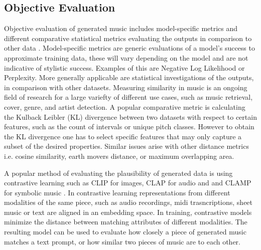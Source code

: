 \subsection{Objective Evaluation}

Objective evaluation of generated music includes model-specific metrics and different comparative statistical metrics evaluating the outputs in comparison to other data \cite{Xiong_Wang_ai_eval_methods_2023}. Model-specific metrics are generic evaluations of a model's success to approximate training data, these will vary depending on the model and are not indicative of stylistic success. Examples of this are Negative Log Likelihood \cite{Huang_Vaswani_Uszkoreit_Shazeer_Simon_Hawthorne_Dai_Hoffman_Dinculescu_Eck_2018} or Perplexity\cite{Rütte_figaro_2023}. 
More generally applicable are statistical investigations of the outputs, in comparison with other datasets. Measuring similarity in music is an ongoing field of research \cite{Gurjar_Moon_similarity_2018} for a large variefty of different use cases, such as music retrieval, cover, genre, and artist detection. A popular comparative metric is calculating the Kulback Leibler (KL) divergence between two datasets with respect to certain features, such as the count of intervals or unique pitch classes. However to obtain the KL divergence one has to select specific features that may only capture a subset of the desired properties. Similar issues arise with other distance metrics i.e. cosine similarity, earth movers distance, or maximum overlapping area. 

A popular method of evaluating the plausibility of generated data is using contrastive learning such as CLIP for images, CLAP for audio and \cite{Elizalde_Deshmukh_Ismail_Wang_2023} and CLAMP for symbolic music \cite{wu2024clamp2multimodalmusic}.  In contrastive learning representations from different modalities of the same piece, such as audio recordings, midi trasncriptions, sheet music or text are aligned in an embedding space. In training, contrastive models minimize the distance between matching attributes of different modalities. The resulting model can be used to evaluate how closely a piece of generated music matches a text prompt, or how similar two pieces of music are to each other. 

